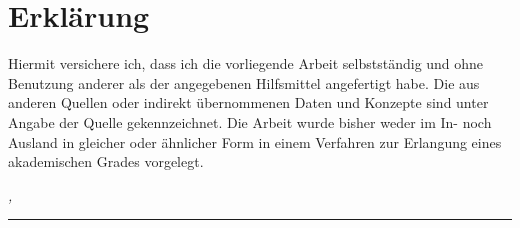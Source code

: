 %
\chapter*{Erklärung}
\label{sec:declaration}
\thispagestyle{empty}

Hiermit versichere ich, dass ich die vorliegende Arbeit selbstständig und ohne Benutzung anderer als der angegebenen Hilfsmittel angefertigt habe. Die aus anderen Quellen oder indirekt übernommenen Daten und Konzepte sind unter Angabe der Quelle gekennzeichnet. Die Arbeit wurde bisher weder im In- noch Ausland in gleicher oder ähnlicher Form in einem Verfahren zur Erlangung eines akademischen Grades vorgelegt.

\bigskip

\noindent\textit{\thesisUniversityCity, \thesisDate}

\smallskip

\begin{flushright}
	\begin{minipage}{5cm}
		\rule{\textwidth}{1pt}
		\centering\thesisName
	\end{minipage}
\end{flushright}

